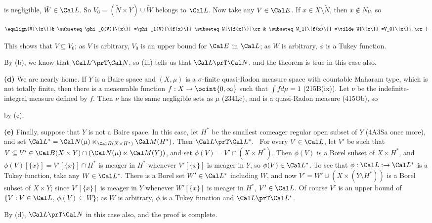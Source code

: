 {

\noindent is negligible, $\tilde W\in\Cal L$.   So
$V_0=(\tilde N\times Y)\cup\tilde W$ belongs to $\Cal L$.
Now take any $V\in\Cal E$.   If
$x\in X\setminus\tilde N$, then $x\notin N_V$, so

$$\eqalign{V[\{x\}]&
\subseteq\phi_0(V)[\{x\}]
=\phi_1(V)[\{f(x)\}]
\subseteq W[\{f(x)\}]\cr&
\subseteq W_1[\{f(x)\}]
=\tilde W[\{x\}]
=V_0[\{x\}].\cr}$$

\noindent This shows that $V\subseteq V_0$;  as $V$ is arbitrary, $V_0$
is an upper bound for $\Cal E$ in $\Cal L$;  as $W$ is arbitrary, $\phi$
is a Tukey function.\ \Qed

\medskip

 By (b), we know that $\Cal L'\prT\Cal N$, so (iii)
tells us that $\Cal L\prT\Cal N$, and the theorem is true in this case
also.

\medskip

{\bf (d)} We are nearly home.   If $Y$ is a Baire space and $(X,\mu)$ is
a $\sigma$-finite quasi-Radon measure space with countable Maharam type,
which is not totally finite, then
there is a measurable function $f:X\to\ooint{0,\infty}$ such that
$\int fd\mu=1$ (215B(ix)).   Let $\nu$ be the indefinite-integral
measure defined by $f$.   Then $\nu$ has the same
negligible sets as $\mu$ (234Lc), and is a quasi-Radon measure (415Ob), so


\noindent by (c).

\medskip

{\bf (e)} Finally, suppose that $Y$ is not a Baire space.   In this
case, let $H^*$ be the smallest
comeager regular open subset of $Y$ (4A3Sa once more), and set
$\Cal L^*=\Cal N(\mu)\ltimes_{\Cal B(X\times H^*)}\Cal M(H^*)$.
Then $\Cal L\prT\Cal L^*$.
\Prf\ For every $V\in\Cal L$, let
$V'$ be such that
$V\subseteq V'\in\Cal B(X\times Y)\cap(\Cal N(\mu)\ltimes\Cal M(Y))$, and set
$\phi(V)=V'\cap(X\times H^*)$.   Then
$\phi(V)$ is a Borel subset of $X\times H^*$,
and $\phi(V)[\{x\}]=V'[\{x\}]\cap H^*$ is meager in $H^*$ whenever
$V'[\{x\}]$ is meager in $Y$, so $\phi(V)\in\Cal L^*$.   To see that
$\phi:\Cal L:\to\Cal L^*$ is
a Tukey function, take any $W\in\Cal L^*$.   There is a Borel set
$W'\in\Cal L^*$ including $W$, and now $V'=W'\cup(X\times(Y\setminus H^*))$
is a Borel subset of $X\times Y$;  since $V'[\{x\}]$ is meager in $Y$
whenever $W'[\{x\}]$ is meager in $H^*$, $V'\in\Cal L$.   Of course $V'$
is an upper bound
of $\{V:V\in\Cal L$, $\phi(V)\subseteq W\}$;  as $W$ is arbitrary,
$\phi$ is a Tukey function and $\Cal L\prT\Cal L^*$.\ \Qed

By (d), $\Cal L\prT\Cal N$ in this case also, and the proof is complete.
}%

